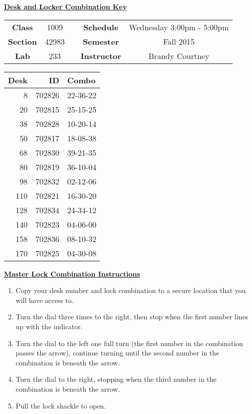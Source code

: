 \documentclass[12pt]{article}
\begin{document}
\thispagestyle{empty}

\begin{center}
	{\huge\textbf{\underline{ Desk and Locker Combination Key}}}
\end{center}


\begin{table}[h]
  \centering
  \begin{tabular}{ccccc}

  \textbf{Class} & 1009 & {\qquad} &\textbf{Schedule} & Wednesday 3:00pm - 5:00pm \\
  \textbf{Section} & 42983 & {\qquad} & \textbf{Semester} & Fall 2015 \\
  \textbf{Lab} & 233 & {\qquad} & \textbf{Instructor} & Brandy Courtney \\
  \end{tabular}
\end{table}
 \vspace{0.1in}
\begin{minipage}{0.4\textwidth}

\begin{tabular}{rrl}
\toprule
 Desk &      ID &     Combo \\
\midrule
    8 &  702826 &  22-36-22 \\
   20 &  702815 &  25-15-25 \\
   38 &  702828 &  10-20-14 \\
   50 &  702817 &  18-08-38 \\
   68 &  702830 &  39-21-35 \\
   80 &  702819 &  36-10-04 \\
   98 &  702832 &  02-12-06 \\
  110 &  702821 &  16-30-20 \\
  128 &  702834 &  24-34-12 \\
  140 &  702823 &  04-06-00 \\
  158 &  702836 &  08-10-32 \\
  170 &  702825 &  04-30-08 \\
\bottomrule
\end{tabular}


\end{minipage}
\begin{minipage}{0.4\textwidth}
\underline{{\large \textbf{Master Lock Combination Instructions}}}
\begin{enumerate}
\item Copy your desk number and lock combination to a secure location that you will have access to.
\item Turn the dial three times to the right, then stop when the first number lines up with the indicator.
\item Turn the dial to the left one full turn (the first number in the combination passes the arrow), continue turning until the second number in the combination is beneath the arrow.
\item Turn the dial to the right, stopping when the third number in the combination is beneath the arrow.
\item Pull the lock shackle to open.
\end{enumerate}
\end{minipage}
\end{document}
